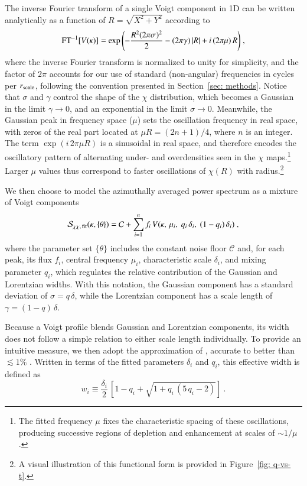 \documentclass[fleqn,usenatbib]{mnras}
\begin{document}
The inverse Fourier transform of a single Voigt component in 1D can be written analytically as a function of $R = \sqrt{X^{2} + Y^{2}}$ according to
\begin{equation} \label{eq: voigt_real}
\displaystyle{{\rm FT}^{-1}[ V(\kappa)]= \exp{\left(- \frac{R^2 (2\pi\sigma)^2}{2} -(2\pi\gamma) \, |R| + i \, (2\pi \mu) \, R\right)}} \ ,
\end{equation}
%
where the inverse Fourier transform is normalized to unity for simplicity, and the factor of $2\pi$ accounts for our use of standard (non-angular) frequencies in cycles per $r_{\rm scale}$, following the convention presented in Section~\ref{sec: methods}.
Notice that $\sigma$ and $\gamma$ control the shape of the $\chi$ distribution, which becomes a Gaussian in the limit $\gamma\to 0$, and an exponential in the limit $\sigma\to 0$. Meanwhile, the Gaussian peak in frequency space ($\mu$) sets the oscillation frequency in real space, with zeros of the real part located at $\mu R = (2n+1)/4$, where $n$ is an integer. The term $\exp(i\,2\pi \mu R)$ is a sinusoidal in real space, and therefore encodes the oscillatory pattern of alternating under- and overdensities seen in the $\chi$ maps.\footnote{The fitted frequency $\mu$ fixes the characteristic spacing of these oscillations, producing successive regions of depletion and enhancement at scales of $\sim 1/\mu$.} Larger $\mu$ values thus correspond to faster oscillations of $\chi(R)$ with radius.\footnote{A visual illustration of this functional form is provided in Figure~\ref{fig: q-vs-t}.}

We then choose to model the azimuthally averaged power spectrum as a mixture of Voigt components
\begin{equation} \label{eq: power-spectrum}
\mathcal{S}_{\chi \chi, \, {\rm fit}}(\kappa, \{\theta\}) = \mathcal{C} + \sum_{i=1}^{n} f_i \, V(\kappa, \, \mu_i, \ q_i \, \delta_i, \ (1 - q_i) \, \delta_i) \ ,
\end{equation}
where the parameter set $\{\theta\}$ includes the constant noise floor $\mathcal{C}$ and, for each peak, its flux $f_i$, central frequency $\mu_i$, characteristic scale $\delta_i$, and mixing parameter $q_i$, which regulates the relative contribution of the Gaussian and Lorentzian widths. With this notation, the Gaussian component has a standard deviation of $\sigma=q \, \delta$, while the Lorentzian component has a scale length of $\gamma=(1 - q) \, \delta$.


Because a Voigt profile blends Gaussian and Lorentzian components, its width does not follow a simple relation to either scale length individually. To provide an intuitive measure, we then adopt the approximation of \citet{Whiting68}, accurate to better than $\lesssim 1\%$ \citep{Olivero&Longbothum77}. Written in terms of the fitted parameters $\delta_{i}$ and $q_{i}$, this effective width is defined as
\begin{equation}    \label{eq: voigt-width}
    w_{i} \equiv \frac{\delta_{i}}{2} \, \left[ 1 - q_{i} + \sqrt{1 + q_{i} \, (5 \, q_{i} - 2)} \right]  \  .
\end{equation}
\end{document}
